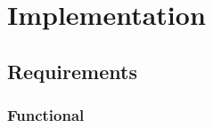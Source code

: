 \documentclass[11pt]{article}
\begin{document}
\begin{figure}
\begin{minipage}[c]{0.35\textwidth}
                \end{minipage}
            \end{figure}
                        \clearpage
            

\newpage
\section{Implementation}

\subsection{Requirements}
    
    \subsubsection{Functional}
    
\end{document}
